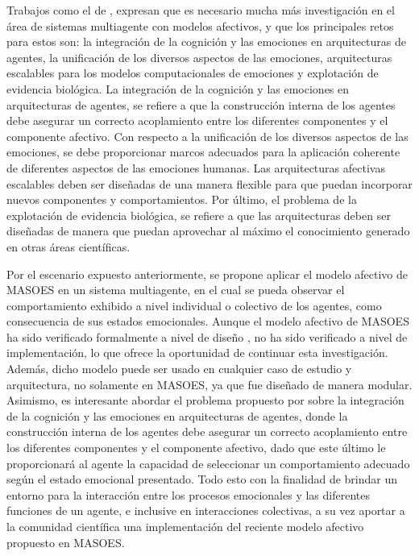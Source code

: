 Trabajos como el de \cite{rodriguez2015}, expresan que es necesario mucha
más investigación en el área de sistemas multiagente con modelos afectivos, y
que los principales retos para estos son: la integración de la cognición y las
emociones en arquitecturas de agentes, la unificación de los diversos aspectos
de las emociones, arquitecturas escalables para los modelos computacionales de
emociones y explotación de evidencia biológica. La integración de la cognición y
las emociones en arquitecturas de agentes, se refiere a que la construcción
interna de los agentes debe asegurar un correcto acoplamiento entre los
diferentes componentes y el componente afectivo. Con respecto a la unificación
de los diversos aspectos de las emociones, se debe proporcionar marcos adecuados
para la aplicación coherente de diferentes aspectos de las emociones humanas.
Las arquitecturas afectivas escalables deben ser diseñadas de una manera
flexible para que puedan incorporar nuevos componentes y comportamientos. Por
último, el problema de la explotación de evidencia biológica, se refiere a que
las arquitecturas deben ser diseñadas de manera que puedan aprovechar al máximo
el conocimiento generado en otras áreas científicas.

Por el escenario expuesto anteriormente, se propone aplicar el modelo afectivo
de MASOES en un sistema multiagente, en el cual se pueda observar el
comportamiento exhibido a nivel individual o colectivo de los agentes, como
consecuencia de sus estados emocionales. Aunque el modelo afectivo de MASOES ha
sido verificado formalmente a nivel de diseño \citep{perozo2011}, no ha sido
verificado a nivel de implementación, lo que ofrece la oportunidad de continuar
esta investigación. Además, dicho modelo puede ser usado en cualquier caso de
estudio y arquitectura, no solamente en MASOES, ya que fue diseñado de manera
modular. Asimismo, es interesante abordar el problema propuesto por
\cite{rodriguez2015} sobre la integración de la cognición y las emociones en
arquitecturas de agentes, donde la construcción interna de los agentes debe
asegurar un correcto acoplamiento entre los diferentes componentes y el
componente afectivo, dado que este último le proporcionará al agente la
capacidad de seleccionar un comportamiento adecuado según el estado emocional
presentado. Todo esto con la finalidad de brindar un entorno para la
interacción entre los procesos emocionales y las diferentes funciones de un
agente, e inclusive en interacciones colectivas, a su vez aportar a la
comunidad científica una implementación del reciente modelo afectivo propuesto
en MASOES.

